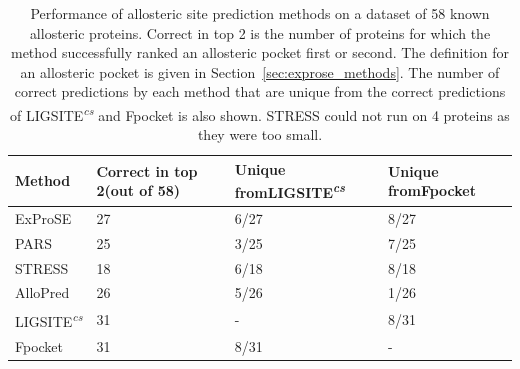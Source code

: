 \begin{table}
\centering

\begin{footnotesize}
\begin{tabular}{ p{3cm} p{3cm} p{3cm} p{3cm} }
\hline
\textbf{Method} & \textbf{Correct in top 2\newline (out of 58)} & \textbf{Unique from\newline LIGSITE\textsuperscript{\it cs}} & \textbf{Unique from\newline Fpocket} \\
\hline
ExProSE                         & 27 & 6/27 & 8/27 \\
PARS                            & 25 & 3/25 & 7/25 \\
STRESS                          & 18 & 6/18 & 8/18 \\
AlloPred                        & 26 & 5/26 & 1/26 \\
LIGSITE\textsuperscript{\it cs} & 31 & -    & 8/31 \\
Fpocket                         & 31 & 8/31 & -    \\
\hline
\end{tabular}
\end{footnotesize}

\caption[Performance of allosteric site prediction methods on a dataset of 58 known allosteric proteins - summary]
{Performance of allosteric site prediction methods on a dataset of 58 known allosteric proteins.
Correct in top 2 is the number of proteins for which the method successfully ranked an allosteric pocket first or second.
The definition for an allosteric pocket is given in Section~\ref{sec:exprose_methods}.
The number of correct predictions by each method that are unique from the correct predictions of LIGSITE\textsuperscript{\it cs} and Fpocket is also shown.
STRESS could not run on 4 proteins as they were too small.}

\label{tab:allosteric_methods}
\end{table}


